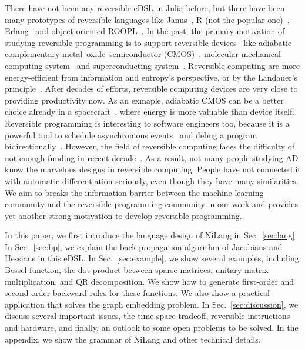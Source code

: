 \documentclass[aps,twocolumn,longbibliography,english,superscriptaddress]{revtex4-1}
\newcommand{\<}{\langle}
\renewcommand{\>}{\rangle}
\newcommand{\Sec}[1]{Sec.~\ref{#1}}
\theoremstyle{definition}\newtheorem{definition}{\textit{Definition}}
\begin{document}
There have not been any reversible eDSL in Julia before, but there have been many prototypes of reversible languages like Janus~\cite{Lutz1986}, R (not the popular one)~\cite{Frank1997}, Erlang~\cite{Lanese2018} and object-oriented ROOPL~\cite{Haulund2017}. %
    In the past, the primary motivation of studying reversible programming is to support reversible devices~\cite{Frank1999} like adiabatic complementary metal–oxide–semiconductor (CMOS)~\cite{Koller1992}, molecular mechanical computing system~\cite{Merkle2018} and superconducting system~\cite{Likharev1977,Semenov2003}.
    Reversible computing are more energy-efficient from information and entropy's perspective, or by the Landauer's principle~\cite{Landauer1961}.
    After decades of efforts, reversible computing devices are very close to providing productivity now. As an exmaple, adiabatic CMOS can be a better choice already in a spacecraft~\cite{Debenedictis2017}, where energy is more valuable than device itself.
    Reversible programming is interesting to software engineers too, because it is a powerful tool to schedule asynchronious events~\cite{Jefferson1985} and debug a program bidirectionally~\cite{Boothe2000}.
    However, the field of reversible computing faces the difficulty of not enough funding in recent decade~\cite{Frank2017}. As a result, not many people studying AD know the marvelous designs in reversible computing. People have not connected it with automatic differentiation seriously, even though they have many similarities. We aim to breaks the information barrier between the machine learning community and the reversible programming community in our work and provides yet another strong motivation to develop reversible programming.

    In this paper, we first introduce the language design of NiLang in \Sec{sec:lang}.
    In \Sec{sec:bp}, we explain the back-propagation algorithm of Jacobians and Hessians in this eDSL.
    In \Sec{sec:example}, we show several examples, including Bessel function, the dot product between sparse matrices, unitary matrix multiplication, and QR decomposition. We show how to generate first-order and second-order backward rules for these functions. We also show a practical application that solves the graph embedding problem.
    In \Sec{sec:discussion}, we discuss several important issues, the time-space  tradeoff, reversible instructions and hardware, and finally, an outlook to some open problems to be solved.
    In the appendix, we show the grammar of NiLang and other technical details.
\end{document}
